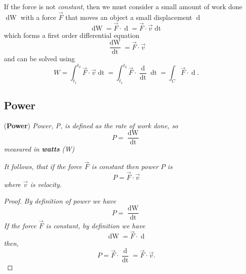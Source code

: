 If the force is not \textit{constant}, then we must consider a small amount of work done $\mathop{\mathrm{d}W}$ with a force  $\vec{F}$ that moves an object a small displacement $\mathop{\mathrm{d}\vec{s}}$
\begin{equation*}
    \mathop{\mathrm{d}W} = \vec{F} \cdot \mathop{\mathrm{d}\vec{s}} = \vec{F} \cdot \vec{v} \mathop{\mathrm{d}t}
\end{equation*}
which forms a first order differential equation
\begin{equation*}
    \frac{\mathop{\mathrm{d}W}}{\mathop{\mathrm{d}t}} = \vec{F} \cdot \vec{v}
\end{equation*}
and can be solved using
\begin{equation}
    \label{eq:work-done-variable-force-vector}
    W = \int_{t_1}^{t_2} \vec{F} \cdot \vec{v} \mathop{\mathrm{d}t} = \int_{t_1}^{t_2} \vec{F} \cdot \frac{\mathop{\mathrm{d}\vec{s}}}{\mathop{\mathrm{d}t}} \mathop{\mathrm{d}t} = \int_C \vec{F} \cdot \mathop{\mathrm{d}\vec{s}}.
\end{equation}

\subsection{Power}
\label{subsection:power}

\begin{definition}{(\textbf{Power})}
\label{def:power}
\textit{Power, P, is defined as the rate of work done, so}
\begin{equation}
    P = \frac{\mathop{\mathrm{d}W}}{\mathop{\mathrm{d}t}}
\end{equation}
\textit{measured in \textbf{watts} (W)}
\end{definition}

\begin{corollary}
\textit{It follows, that if the force $\vec{F}$ is constant then power $P$ is}
\begin{equation}
    P = \vec{F} \cdot \vec{v}
\end{equation}
\textit{where $\vec{v}$ is velocity.}

\begin{proof}
\textit{By definition of power we have}
\begin{equation*}
    P = \frac{\mathop{\mathrm{d}W}}{\mathop{\mathrm{d}t}}
\end{equation*}
\textit{If the force $\vec{F}$ is constant, by definition we have}
\begin{equation*}
    \mathop{\mathrm{d}W} = \vec{F} \cdot \mathop{\mathrm{d}\vec{s}}
\end{equation*}
\textit{then,}
\begin{equation*}
    P = \vec{F} \cdot \frac{\mathop{\mathrm{d}\vec{s}}}{\mathop{\mathrm{d}t}} = \vec{F} \cdot \vec{v}.
\end{equation*}
\end{proof}
\end{corollary}


